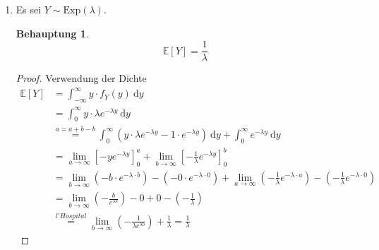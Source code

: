 \documentclass[a4paper]{scrartcl}
\newtheorem*{behaupt}{Behauptung}
\newcommand{\dif}{\ \mathrm{d}}
\newcommand{\e}{\mathbb{E}}
\def \blattnr {4}
\begin{document}
\begin{enumerate}[label=\bfseries \blattnr.\arabic*]
\begin{enumerate}
            \item
                Es sei $Y \sim \text{Exp}(\lambda)$.
                \begin{behaupt}
                    \begin{equation*}
                        \e[Y] = \frac{1}{\lambda}
                    \end{equation*}
                \end{behaupt}
                \begin{proof}
                    Verwendung der Dichte
                    \begin{equation*}
                        \begin{split}
                            \e[Y]
                            &= \int_{-\infty}^\infty y \cdot f_Y(y) \dif y \\
                            &= \int_0^\infty y \cdot
                                \lambda e^{-\lambda y} \dif y \\
                            &\stackrel{a=a+b-b}{=} \int_0^\infty 
				\left(y \cdot \lambda e^{-\lambda y} 
				  - 1 \cdot e^{-\lambda y} \right) \dif y 
				+ \int_0^\infty e^{-\lambda y} \dif y \\
                            &= \lim_{a \to \infty} \left[ -y e^{-\lambda y}
                                \right]_0^a
                                + \lim_{b \to \infty} \left[ -\frac{1}{\lambda} e^{-\lambda y}
                                \right]_0^b \\
                            &= \lim_{b \to \infty} \left( -b \cdot 
                                e^{-\lambda \cdot b} \right)
                                - \left( - 0 \cdot 
                                e^{-\lambda \cdot 0} \right)
                                + \lim_{a \to \infty}
                                \left( -\frac{1}{\lambda} e^{-\lambda \cdot a}
                                \right) - \left( -\frac{1}{\lambda}
                                e^{-\lambda \cdot 0} \right) \\
                            &= \lim_{b \to \infty} \left( - \frac{b}{e^{\lambda b}} \right) - 0 + 0 - \left(-\frac1\lambda \right) \\
                            &\stackrel{l'Hospital}{=} \lim_{b \to \infty} \left( - \frac{1}{\lambda e^{\lambda b}} \right) + \frac1\lambda 
                             = \frac{1}{\lambda}
                        \end{split}
                    \end{equation*}

\end{proof}
\end{enumerate}
\end{enumerate}
\end{document}
